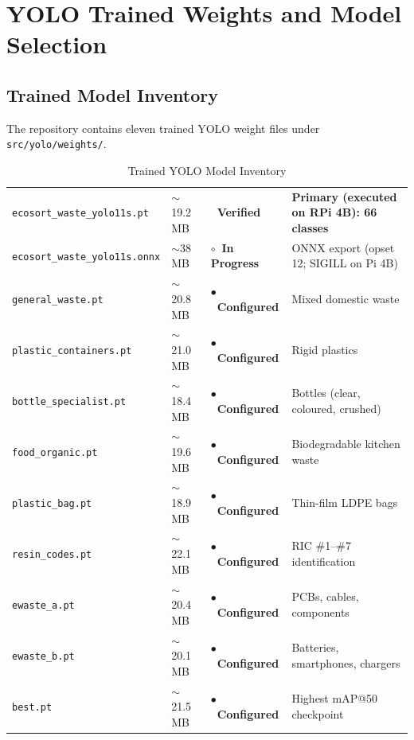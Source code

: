 \documentclass[12pt,a4paper]{article}
\newcommand{\verified}{{\color{statusgreen}\textbf{\checkmark~Verified}}}
\newcommand{\configured}{{\color{statusblue}\textbf{$\bullet$~Configured}}}
\newcommand{\inprogress}{{\color{statusamber}\textbf{$\circ$~In Progress}}}
\begin{document}
\clearpage

\section{YOLO Trained Weights and Model Selection}

\subsection{Trained Model Inventory}

The repository contains eleven trained YOLO weight files under \texttt{src/yolo/weights/}.

\renewcommand{\arraystretch}{1.30}
\begin{table}[H]
\centering
\caption{Trained YOLO Model Inventory}
\label{tab:models}
\small
\begin{tabularx}{\linewidth}{@{} L{5.6cm} C{1.7cm} C{2.3cm} X @{}}
\toprule
{} &  &  &  \\
\midrule
{}
{\footnotesize\texttt{ecosort\_waste\_yolo11s.pt}}   & $\sim$19.2\,MB & \verified   & \textbf{Primary (executed on RPi 4B): 66 classes} \\
{\footnotesize\texttt{ecosort\_waste\_yolo11s.onnx}} & $\sim$38\,MB   & \inprogress & ONNX export (opset 12; SIGILL on Pi 4B) \\
\texttt{general\_waste.pt}           & $\sim$20.8\,MB & \configured & Mixed domestic waste \\
\texttt{plastic\_containers.pt}      & $\sim$21.0\,MB & \configured & Rigid plastics \\
\texttt{bottle\_specialist.pt}       & $\sim$18.4\,MB & \configured & Bottles (clear, coloured, crushed) \\
\texttt{food\_organic.pt}            & $\sim$19.6\,MB & \configured & Biodegradable kitchen waste \\
\texttt{plastic\_bag.pt}             & $\sim$18.9\,MB & \configured & Thin-film LDPE bags \\
\texttt{resin\_codes.pt}             & $\sim$22.1\,MB & \configured & RIC \#1--\#7 identification \\
\texttt{ewaste\_a.pt}                & $\sim$20.4\,MB & \configured & PCBs, cables, components \\
\texttt{ewaste\_b.pt}                & $\sim$20.1\,MB & \configured & Batteries, smartphones, chargers \\
\texttt{best.pt}                     & $\sim$21.5\,MB & \configured & Highest mAP@50 checkpoint \\
\bottomrule
\end{tabularx}
\end{table}
\end{document}
